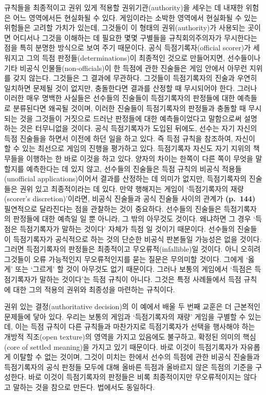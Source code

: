 규칙들을 최종적이고 권위 있게 적용할 권위기관(authority)을 세우는 데
내재한 위험은 어느 영역에서든 현실화될 수 있다. 게임이라는 소박한
영역에서 현실화될 수 있는 위험들은 고려할 가치가 있는데, 그것들이 이
형태의 권위(authority)가 사용되는 곳이면 어디서나 그것을 이해하는 데
필요한 몇몇 구별들을 규칙회의주의자가 무시한다는 점을 특히 분명한
방식으로 보여 주기 때문이다. 공식 득점기록자(official scorer)가 세워지고
그의 득점 판정들(determinations)이 최종적인 것으로 만들어지면,
선수들이나 기타 비공식 인물들(non-officials)이 한 득점에 관한 진술들은
게임 안에서 아무런 지위를 갖지 않는다. 그것들은 그 결과에 무관하다.
그것들이 득점기록자의 진술과 우연히 일치하면 문제될 것이 없지만,
충돌한다면 결과를 산정할 때 무시되어야 한다. 그러나 이러한 매우 명백한
사실들은 선수들의 진술들이 득점기록자의 판정들에 대한 예측들로
분류된다면 왜곡될 것이며, 이러한 진술들이 득점기록자의 판정들과 충돌할
때 무시되는 것을 그것들이 거짓으로 드러난 판정들에 대한 예측들이었다고
말함으로써 설명하는 것은 터무니없을 것이다. 공식 득점기록자가 도입된
뒤에도, 선수는 자기 자신의 득점 진술들을 하면서 이전에 하던 일을 하고
있다. 즉 득점 규칙을 참조하여, 자신이 할 수 있는 최선으로 게임의 진행을
평가하고 있다. 득점기록자 자신도 자기 지위의 책무들을 이행하는 한 바로
이것을 하고 있다. 양자의 차이는 한쪽이 다른 쪽이 무엇을 말할지를
예측한다는 데 있지 않고, 선수들의 진술들은 득점 규칙의 비공식
적용들(unofficial applications)이어서 결과를 산정하는 데 의미가 없지만,
득점기록자의 진술들은 권위 있고 최종적이라는 데 있다. 만약 행해지는
게임이 ‘득점기록자의 재량(scorer’s discretion)'이라면, 비공식 진술들과
공식 진술들 사이의 관계가 \textbf{(p.~144)} 필연적으로 달라진다는 점을
관찰하는 것이 중요하다. 선수들의 진술들은 득점기록자의 판정들에 대한
예측일 일 뿐 아니라, 그 밖의 아무것도  것이다. 왜냐하면 그 경우 ‘득점은 득점기록자가 말하는
것이다’ 자체가 득점 일 것이기 때문이다. 선수들의 진술들이
득점기록자가 공식적으로 하는 것의 단순한 비공식 판본들일 가능성은 없을
것이다. 그러면 득점기록자의 판정들은 최종적이고 무오류적(infallible)일
것이다. 아니 오히려 그것들이 오류 가능적인지 무오류적인지를 묻는 질문은
무의미할 것이다. 그에게 ‘옳게’ 또는 ‘그르게’ 할 것이 아무것도 없기
때문이다. 그러나 보통의 게임에서 ‘득점은 득점기록자가 말하는 것이다’는
득점 규칙이 아니다. 그것은 특정 사례들에서 득점 규칙에 대한 그의 적용의
권위와 최종성을 마련하는 규칙이다.

권위 있는 결정(authoritative decision)의 이 예에서 배울 두 번째 교훈은
더 근본적인 문제들에 닿아 있다. 우리는 보통의 게임과 ‘득점기록자의 재량’
게임을 구별할 수 있는데, 이는 득점 규칙이 다른 규칙들과 마찬가지로
득점기록자가 선택을 행사해야 하는 개방적 직조(open texture)의 영역을
가지고 있음에도 불구하고, 확정된 의미의 핵심(core of settled meaning)을
가지고 있기 때문이다. 바로 이것이 득점기록자가 자유롭게 이탈할 수 없는
것이며, 그것이 미치는 한에서 선수의 득점에 관한 비공식 진술들과
득점기록자의 공식 판정들 모두에 대해 올바른 득점과 올바르지 않은 득점의
기준을 구성한다. 바로 이것이 득점기록자의 판정들은 비록 최종적이지만
무오류적이지는 않다고 말하는 것을 참으로 만든다. 법에서도 동일하다.

